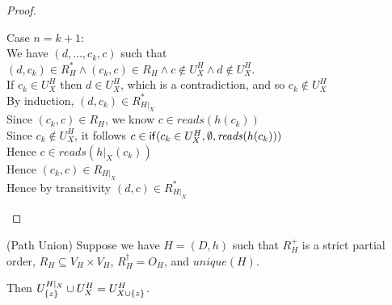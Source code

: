 \begin{proof}
\begin{tabbedproof}
\ooo Case $n = k+1$: \\
\oooo We have $(d, \ldots, c_k, c)$ such that $(d,c_k) \in R^*_H \land (c_k,c) \in R_H \land c \not\in U^H_X \land d \not\in U^H_X$. \\
\oooo If $c_k \in U^H_X$ then $d \in U^H_X$, which is a contradiction, and so $c_k \not\in U^H_X$ \\
\oooo By induction, $(d,   c_k) \in R^*_{H|_X}$ \\
\oooo Since $(c_k,c) \in R_H$, we know $c \in \mathit{reads}(h(c_k))$ \\ 
\oooo Since $c_k \not\in U^H_X$, it follows $c \in \mathsf{if}({c_k \in U^H_X}, {\emptyset}, {\mathit{reads}(h(c_k))})$ \\
\oooo Hence $c \in \mathit{reads }(h|_X(c_k))$ \\
\oooo Hence $(c_k,c) \in R_{H|_X}$ \\
\oooo Hence by transitivity $(d, c) \in R^*_{H|_X}$ \\ 
\end{tabbedproof}
\end{proof}

\begin{lemma}{(Path Union)}
Suppose we have $H = (D,h)$ such that $R^+_H$ is a strict partial
order, $R_H \subseteq V_H \times V_H$, $R^\dagger_H = O_H$, and
$\mathit{unique}(H)$. 

Then $U^{H|_X}_{\{{z}\}} \cup U^H_X = U^H_{X \cup \{{z}\}}$.

\end{lemma}


